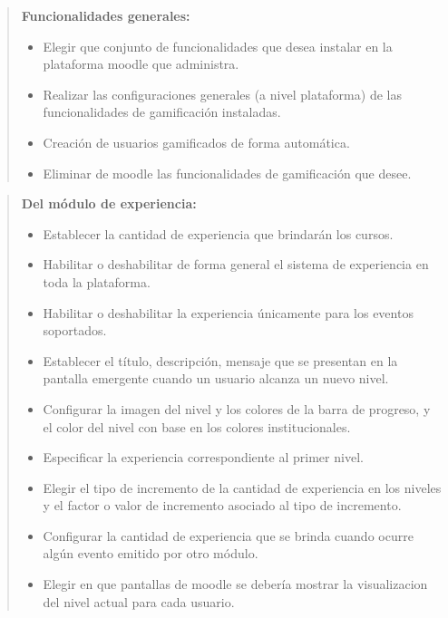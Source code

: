     \begin{quote}
    {\bf Funcionalidades generales:}
        \begin{itemize}
        \item Elegir que conjunto de funcionalidades que desea instalar
              en la plataforma moodle que administra.
        \item Realizar las configuraciones generales (a nivel plataforma) de las
              funcionalidades de gamificación instaladas.
        \item Creación de usuarios gamificados de forma automática.
        \item Eliminar de moodle las funcionalidades de gamificación que desee.
        \end{itemize}
    \end{quote}

    \begin{quote}
    {\bf Del módulo de experiencia:}
        \begin{itemize}
        \item Establecer la cantidad de experiencia que brindarán los cursos.
        \item Habilitar o deshabilitar de forma general el sistema de experiencia
              en toda la plataforma.
        \item Habilitar o deshabilitar la experiencia únicamente para los eventos
              soportados.
        \item Establecer el título, descripción, mensaje que se presentan en la
              pantalla emergente cuando un usuario alcanza un nuevo nivel.
        \item Configurar la imagen del nivel y los colores de la barra de progreso,
              y el color del nivel con base en los colores institucionales.
        \item Especificar la experiencia correspondiente al primer nivel.
        \item Elegir el tipo de incremento de la cantidad de experiencia en los
              niveles y el factor o valor de incremento asociado al tipo de
              incremento.
        \item Configurar la cantidad de experiencia que se brinda cuando ocurre
              algún evento emitido por otro módulo.
        \item Elegir en que pantallas de moodle se debería mostrar la
              visualizacion del nivel actual para cada usuario.
        \end{itemize}
    \end{quote}

